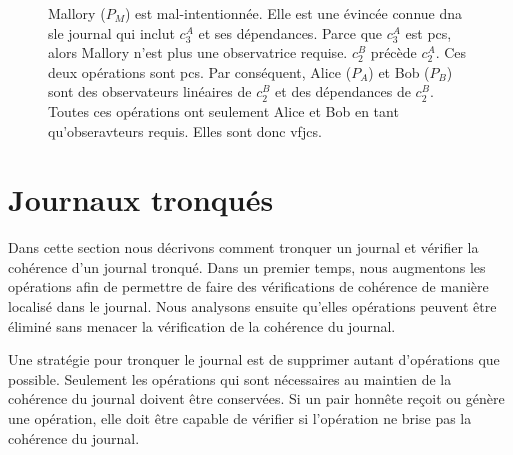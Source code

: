 \begin{figure}[ht]
  \centering
  \begin{utikzhbgraph}
  \end{utikzhbgraph}
  \caption{
  Mallory ($P_M$) est mal-intentionnée.
  Elle est une évincée connue dna sle journal qui inclut $c^A_3$ et ses dépendances.
  Parce que $c^A_3$ est \acf{pcs}, alors Mallory n'est plus une observatrice requise.
  $c^B_2$ précède $c^A_2$.
  Ces deux opérations sont \ac{pcs}.
  Par conséquent, Alice ($P_A$) et Bob ($P_B$) sont des observateurs linéaires de $c^B_2$ et des dépendances de $c^B_2$.
  Toutes ces opérations ont seulement Alice et Bob en tant qu'obseravteurs requis.
  Elles sont donc \acf{vfjcs}.}\label{fig:vfjcs-example}
\end{figure}


\section{Journaux tronqués}


Dans cette section nous décrivons comment tronquer un journal et vérifier la cohérence d'un journal tronqué.
Dans un premier temps, nous augmentons les opérations afin de permettre de faire des vérifications de cohérence de manière localisé dans le journal.
Nous analysons ensuite qu'elles opérations peuvent être éliminé sans menacer la vérification de la cohérence du journal.

Une stratégie pour tronquer le journal est de supprimer autant d'opérations que possible.
Seulement les opérations qui sont nécessaires au maintien de la cohérence du journal doivent être conservées.
Si un pair honnête reçoit ou génère une opération, elle doit être capable de vérifier si l'opération ne brise pas la cohérence du journal.

